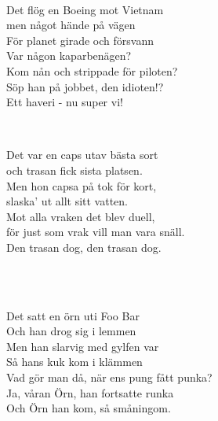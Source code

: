  \\       
\author{Text: Jacke}

\songtext{}Det flög en Boeing mot Vietnam \\
men något hände på vägen \\
För planet girade och försvann \\
Var någon kaparbenägen? \\
Kom nån och strippade för piloten? \\
Söp han på jobbet, den idioten!? \\
Ett haveri - nu super vi! \\

\newpage


 \\       

\songtext{}Det var en caps utav bästa sort\\
och trasan fick sista platsen.\\
Men hon capsa på tok för kort,\\
slaska' ut allt sitt vatten.\\
Mot alla vraken det blev duell,\\
för just som vrak vill man vara snäll.\\
Den trasan dog, den trasan dog.

\\


 \\       
\author{Text: Doomy}

\songtext{}Det satt en örn uti Foo Bar\\
Och han drog sig i lemmen\\ 
Men han slarvig med gylfen var\\ 
Så hans kuk kom i klämmen\\ 
Vad gör man då, när ens pung fått punka?\\ 
Ja, våran Örn, han fortsatte runka\\ 
Och Örn han kom, så småningom. \\


